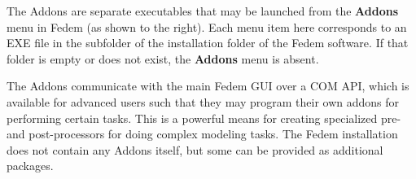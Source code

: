 The Addons are separate executables that may be launched from the
\textbf{Addons} menu in Fedem (as shown to the right).
Each menu item here corresponds to an EXE file in the
 subfolder of the installation folder of the Fedem software.
If that folder is empty or does not exist, the \textbf{Addons} menu is absent.

The Addons communicate with the main Fedem GUI over a COM API,
which is available for advanced users such that they may program their own
addons for performing certain tasks. This is a powerful means for creating
specialized pre- and post-processors for doing complex modeling tasks.
The Fedem installation does not contain any Addons itself, but some can be
provided as additional packages.
